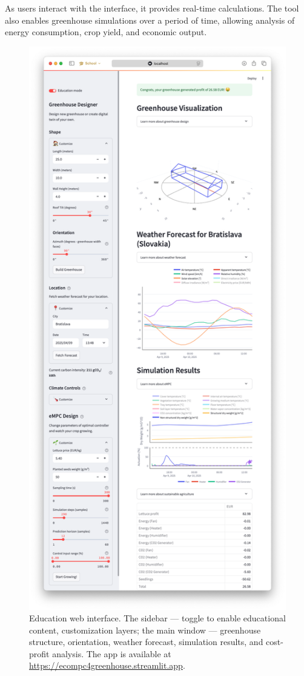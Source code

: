 \documentclass[conference]{IEEEtran}
\begin{document}
As users interact with the interface, it provides real-time calculations. The tool also enables greenhouse simulations over a period of time, allowing analysis of energy consumption, crop yield, and economic output.
\begin{figure}
    \centering
    \includegraphics[width=\linewidth, trim=50 50 20 50]{figures/webpage.png}
    \caption{Education web interface. The sidebar ---  toggle to enable educational content, customization layers; the main window --- greenhouse structure, orientation, weather forecast, simulation results, and cost-profit analysis. The app is available at \url{https://ecompc4greenhouse.streamlit.app}.}\label{fig:web}
\end{figure}
\end{document}
